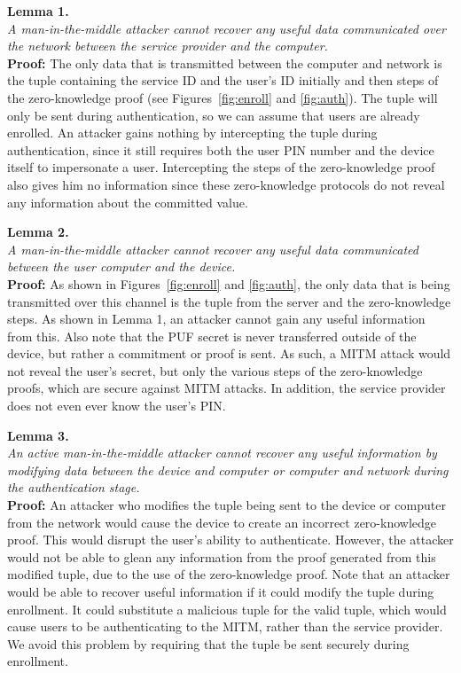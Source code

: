 \noindent \textbf{Lemma 1.} \\
\noindent \emph{A man-in-the-middle attacker cannot recover any useful data communicated over the network between the
service provider and the computer.} \\
{\bf Proof:}  The only data that is transmitted between the computer and network is the tuple containing the service
ID and the user's ID initially and then steps of the zero-knowledge proof (see Figures~\ref{fig:enroll} and
\ref{fig:auth}). The tuple will only be sent during authentication, so we can assume that users are already enrolled.
An attacker gains nothing by intercepting the tuple during authentication, since it still requires both the user PIN
number and the device itself to impersonate a user. Intercepting the steps of the zero-knowledge proof also gives him
no information since these zero-knowledge protocols do not reveal any information about the committed value.

\noindent \textbf{Lemma 2.} \\
\noindent \emph{A man-in-the-middle attacker cannot recover any useful data communicated between the user computer and
the device.} \\
{\bf Proof:}  As shown in Figures~\ref{fig:enroll} and \ref{fig:auth}, the only data that is being transmitted over this channel is
the tuple from the server and the zero-knowledge steps. As shown in Lemma 1, an attacker cannot gain any useful
information from this. 
Also note that the PUF secret is never transferred outside of the device, but rather a commitment or
proof is sent. As such, a MITM attack would not reveal the user's secret, but only the various steps of
the zero-knowledge proofs, which are secure against MITM attacks. In addition, the service provider does not even ever
know the user's PIN.%

\noindent \textbf{Lemma 3.} \\
\noindent \emph{An active man-in-the-middle attacker cannot recover any useful information by modifying data between
the device and computer or computer and network during the authentication stage.} \\
{\bf Proof:}  An attacker who modifies the tuple being sent to the device or computer from the network would cause the
device to create an incorrect zero-knowledge proof. This would disrupt the user's ability to authenticate. However,
the attacker would not be able to glean any information from the proof generated from this modified tuple, due to the
use of the zero-knowledge proof.
Note that an attacker would be able to recover useful information if it could modify the tuple during enrollment. It
could substitute a malicious tuple for the valid tuple, which would cause users to be authenticating to the MITM, rather
than the service provider. We avoid this problem by requiring that the tuple be sent securely during enrollment.

